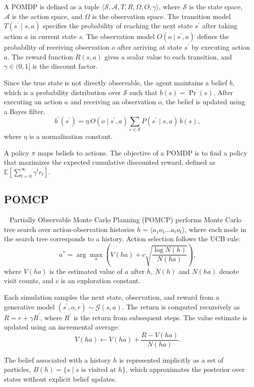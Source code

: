 A POMDP is defined as a tuple $\langle \mathcal{S}, \mathcal{A}, T, R, \Omega, O, \gamma \rangle$, where $\mathcal{S}$ is the state space, $\mathcal{A}$ is the action space, and $\Omega$ is the observation space. The transition model $T(s^\prime \mid s, a)$ specifies the probability of reaching the next state $s^\prime$ after taking action $a$ in current state $s$. The observation model $O(o \mid s^\prime, a)$ defines the probability of receiving observation $o$ after arriving at state $s^\prime$ by executing action $a$. The reward function $R(s,a)$ gives a scalar value to each transition, and $\gamma \in (0,1]$ is the discount factor.

Since the true state is not directly observable, the agent maintains a belief $b$, which is a probability distribution over $\mathcal{S}$ such that $b(s) = \Pr(s)$. After executing an action $a$ and receiving an observation $o$, the belief is updated using a Bayes filter.
\begin{equation}~\label{eq:bayes_inference}
b^\prime(s^\prime) = \eta \, O(o \mid s^\prime,a) \sum_{s \in \mathcal{S}} P(s^\prime \mid s,a) \, b(s),
\end{equation}
where $\eta$ is a normalization constant.

A policy $\pi$ maps beliefs to actions. The objective of a POMDP is to find a policy that maximizes the expected cumulative discounted reward, defined as $\mathbb{E}\left[\sum_{t=0}^{\infty} \gamma^t r_t \right]$.


\subsection{POMCP}~\label{preliminaries:POMCP}
Partially Observable Monte Carlo Planning (POMCP) performs Monte Carlo tree search over action-observation histories $h = \langle a_1 o_1 \dots a_t o_t \rangle$, where each node in the search tree corresponds to a history. Action selection follows the UCB rule:
\begin{equation}~\label{eq:ucb}
a^* = \arg\max_a \left( V(ha) + c \sqrt{\frac{\log N(h)}{N(ha)}} \right),
\end{equation}
where $V(ha)$ is the estimated value of $a$ after $h$, $N(h)$ and $N(ha)$ denote visit counts, and $c$ is an exploration constant.

Each simulation samples the next state, observation, and reward from a generative model $(s^\prime, o, r) \sim \mathcal{G}(s,a)$. The return is computed recursively as $R = r + \gamma R^\prime$, where $R^\prime$ is the return from subsequent steps. The value estimate is updated using an incremental average:
\begin{equation}~\label{eq:value_update}
V(ha) \leftarrow V(ha) + \frac{R - V(ha)}{N(ha)}.
\end{equation}

The belief associated with a history $h$ is represented implicitly as a set of particles, $B(h) = \{ s \mid s \text{ is visited at } h \}$, which approximates the posterior over states without explicit belief updates.
